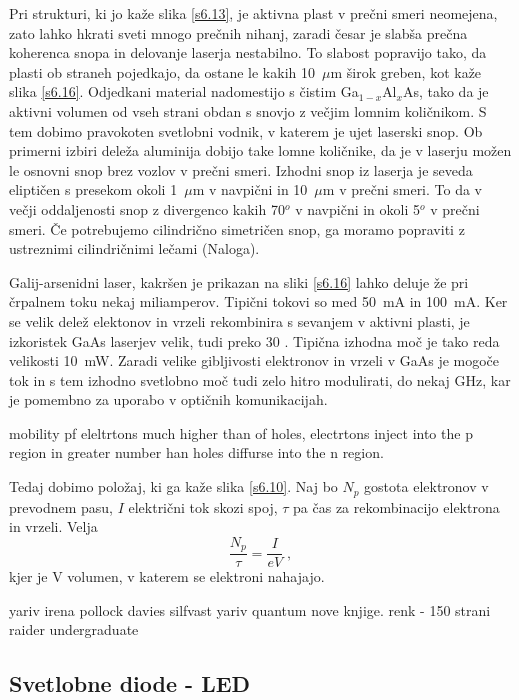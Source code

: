 Pri strukturi, ki jo kaže slika \ref{s6.13}, je aktivna plast v prečni
smeri neomejena, zato lahko hkrati sveti mnogo prečnih nihanj, zaradi
česar je slabša prečna koherenca snopa in delovanje laserja nestabilno.
To slabost popravijo tako, da plasti ob straneh pojedkajo, da ostane le
kakih 10~$\mu$m širok greben, kot kaže slika \ref{s6.16}. Odjedkani
material nadomestijo s čistim Ga$_{1-x}$Al$_x$As, tako da je aktivni
volumen od vseh strani obdan s snovjo z večjim lomnim količnikom. S tem
dobimo pravokoten svetlobni vodnik, v katerem je ujet laserski snop. Ob
primerni izbiri deleža aluminija dobijo take lomne količnike, da je v
laserju možen le osnovni snop brez vozlov v prečni smeri. Izhodni snop iz
laserja je seveda eliptičen s presekom okoli 1~$\mu$m v navpični in 10~$\mu
$m v prečni smeri. To da v večji oddaljenosti snop z divergenco kakih 70$^o
$ v navpični in okoli 5$^o$ v prečni smeri. Če potrebujemo cilindrično
simetričen snop, ga moramo popraviti z ustreznimi cilindričnimi lečami
(Naloga).

Galij-arsenidni laser, kakršen je prikazan na sliki \ref{s6.16} lahko
deluje že pri črpalnem toku nekaj miliamperov. Tipični tokovi so med
50~mA in 100~mA. Ker se velik delež elektonov in vrzeli rekombinira s
sevanjem v aktivni plasti, je izkoristek GaAs laserjev velik, tudi preko 30
. Tipična izhodna moč je tako reda velikosti
10~mW. Zaradi velike gibljivosti elektronov in vrzeli v GaAs je mogoče tok
in s tem izhodno svetlobno moč tudi zelo hitro modulirati, do nekaj GHz,
kar je pomembno za uporabo v optičnih komunikacijah.




mobility pf eleltrtons much higher than of holes, electrtons inject into the 
p region in greater number han holes diffurse into the n region. 

Tedaj dobimo položaj, ki ga
kaže slika \ref{s6.10}. Naj bo $N_p$ gostota elektronov v prevodnem pasu, $I
$ električni tok skozi spoj, $\tau$ pa čas za rekombinacijo elektrona in
vrzeli. Velja 
\begin{equation}  \label{6.2}
\frac{N_p}{\tau}=\frac{I}{e V}\;,
\end{equation}
kjer je V volumen, v katerem se elektroni nahajajo.

yariv
irena
pollock
davies
silfvast
yariv quantum
nove knjige.
renk - 150 strani
raider
undergraduate

\subsection{Svetlobne diode - LED}